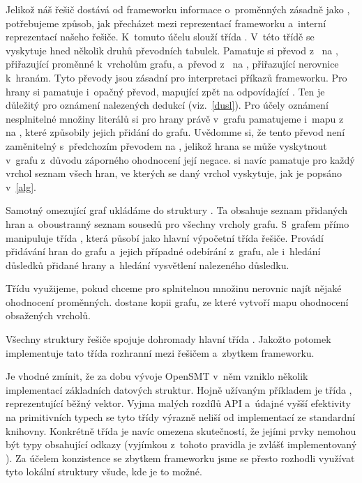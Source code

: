 Jelikož náš řešič dostává od frameworku informace o~proměnných zásadně jako , potřebujeme způsob, jak přecházet mezi reprezentací frameworku a~interní reprezentací našeho řešiče. K~tomuto účelu slouží třída . V~této třídě se vyskytuje hned několik druhů převodních tabulek. Pamatuje si převod z~ na , přiřazující proměnné k~vrcholům grafu, a~převod z~ na , přiřazující nerovnice k~hranám. Tyto převody jsou zásadní pro interpretaci příkazů frameworku. Pro hrany si pamatuje i~opačný převod, mapující  zpět na odpovídající . Ten je důležitý pro oznámení nalezených dedukcí (viz.~\ref{dusl}). Pro účely oznámení nesplnitelné množiny literálů si pro hrany právě v~grafu pamatujeme i~mapu z~ na , které způsobily jejich přidání do grafu. Uvědomme si, že tento převod není zaměnitelný s~předchozím převodem na , jelikož hrana se může vyskytnout v~grafu z~důvodu záporného ohodnocení její negace.  si navíc pamatuje pro každý vrchol seznam všech hran, ve kterých se daný vrchol vyskytuje, jak je popsáno v~\ref{alg}.

Samotný omezující graf ukládáme do struktury . Ta obsahuje seznam přidaných hran a~oboustranný seznam sousedů pro všechny vrcholy grafu. S~grafem přímo manipuluje třída , která působí jako hlavní výpočetní třída řešiče. Provádí přidávání hran do grafu a~jejich případné odebírání z~grafu, ale i~hledání důsledků přidané hrany a~hledání vysvětlení nalezeného důsledku.

Třídu  využijeme, pokud chceme pro splnitelnou množinu nerovnic najít nějaké ohodnocení proměnných.  dostane kopii grafu, ze které vytvoří mapu ohodnocení obsažených vrcholů.

Všechny struktury řešiče spojuje dohromady hlavní třída . Jakožto potomek  implementuje tato třída rozhranní mezi řešičem a~zbytkem frameworku. %

Je vhodné zmínit, že za dobu vývoje OpenSMT v~něm vzniklo několik implementací základních datových struktur. Hojně užívaným příkladem je třída , reprezentující běžný vektor. Vyjma malých rozdílů API a~údajné vyšší efektivity na primitivních typech se tyto třídy výrazně neliší od implementací ze standardní knihovny. Konkrétně třída  je navíc omezena skutečností, že jejími prvky nemohou být typy obsahující odkazy (vyjímkou z~tohoto pravidla je zvlášť implementovaný ). Za účelem konzistence se zbytkem frameworku jsme se přesto rozhodli využívat tyto lokální struktury všude, kde je to možné. 

